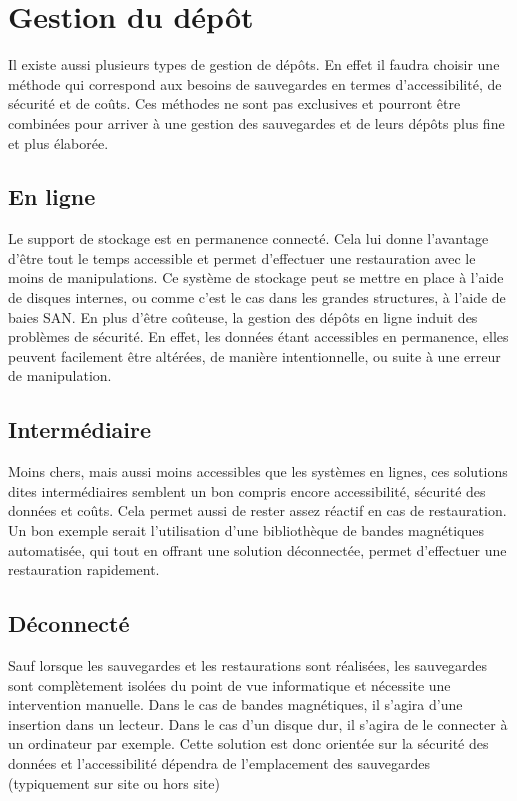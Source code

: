 \documentclass[a4paper,11pt]{report}
\begin{document}
\section{Gestion du dépôt}
Il existe aussi plusieurs types de gestion de dépôts. 
En effet il faudra choisir une méthode qui correspond aux besoins de sauvegardes en termes d'accessibilité, de sécurité et de coûts.
Ces méthodes ne sont pas exclusives et pourront être combinées pour arriver à une gestion des sauvegardes et de leurs dépôts plus fine et plus élaborée.

\subsection{En ligne}
Le support de stockage est en permanence connecté. Cela lui donne l'avantage d'être tout le temps accessible et permet d'effectuer une restauration avec le moins de manipulations.
Ce système de stockage peut se mettre en place à l'aide de disques internes, ou comme c'est le cas dans les grandes structures, à l'aide de baies SAN.
En plus d'être coûteuse, la gestion des dépôts en ligne induit des problèmes de sécurité. En effet, les données étant accessibles en permanence, elles peuvent facilement être altérées, de manière intentionnelle, ou suite à une erreur de manipulation.

\subsection{Intermédiaire}
Moins chers, mais aussi moins accessibles que les systèmes en lignes, ces solutions dites intermédiaires semblent un bon compris encore accessibilité, sécurité des données et coûts.
Cela permet aussi de rester assez réactif en cas de restauration.
Un bon exemple serait l'utilisation d'une bibliothèque de bandes magnétiques automatisée, qui tout en offrant une solution déconnectée, permet d'effectuer une restauration rapidement.

\subsection{Déconnecté}
Sauf lorsque les sauvegardes et les restaurations sont réalisées, les sauvegardes sont complètement isolées du point de vue informatique et nécessite une intervention manuelle.
Dans le cas de bandes magnétiques, il s'agira d'une insertion dans un lecteur. Dans le cas d'un disque dur, il s'agira de le connecter à un ordinateur par exemple.
Cette solution est donc orientée sur la sécurité des données et l'accessibilité dépendra de l'emplacement des sauvegardes (typiquement sur site ou hors site) 
\end{document}
